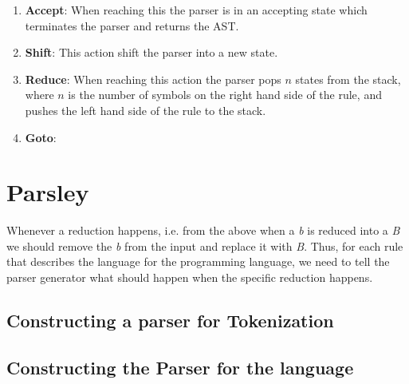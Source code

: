 \begin{enumerate}
  \item \textbf{Accept}: When reaching this the parser is in an accepting state which terminates the parser and returns the AST.
  \item \textbf{Shift}: This action shift the parser into a new state. 
  \item \textbf{Reduce}: When reaching this action the parser pops $n$ states from the stack, where $n$ is the number of symbols on the right hand side of the rule, and pushes the left hand side of the rule to the stack.
  \item \textbf{Goto}:
\end{enumerate}


\section{Parsley}
Whenever a reduction happens, i.e. from the above when a \textit{b} is reduced into a \textit{B} we should remove the \textit{b} from the input and replace it with \textit{B}. Thus, for each rule that describes the language for the programming language, we need to tell the parser generator what should happen when the specific reduction happens.  


\subsection{Constructing a parser for Tokenization}
\subsection{Constructing the Parser for the language}